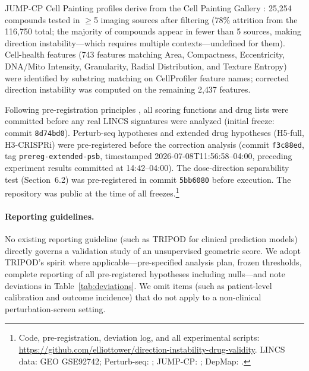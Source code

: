 \documentclass[11pt]{article}
\begin{document}
JUMP-CP Cell Painting profiles derive from the Cell Painting Gallery
\citep{chandrasekaran2023jump}: 25{,}254 compounds tested in $\geq$5
imaging sources after filtering (78\% attrition from the 116{,}750
total; the majority of compounds appear in fewer than 5 sources,
making direction instability---which requires multiple
contexts---undefined for them). Cell-health features (743 features matching Area,
Compactness, Eccentricity, DNA/Mito Intensity, Granularity, Radial
Distribution, and Texture Entropy) were identified by substring matching
on CellProfiler feature names; corrected direction instability was computed
on the remaining 2{,}437 features.

Following pre-registration principles \citep{nosek2018preregistration},
all scoring functions and drug lists were committed before any real LINCS
signatures were analyzed (initial freeze: commit \texttt{8d74bd0}).
Perturb-seq hypotheses and extended drug hypotheses (H5-full,
H3-CRISPRi) were pre-registered before the correction analysis
(commit \texttt{f3c88ed}, tag \texttt{prereg-extended-psb}, timestamped
2026-07-08T11:56:58--04:00, preceding experiment results committed at
14:42--04:00). The dose-direction separability test
(Section~6.2) was pre-registered in commit \texttt{5bb6080} before
execution. The repository was public at the time of all freezes.\footnote{Code, pre-registration, deviation log, and all
experimental scripts:
\url{https://github.com/elliottower/direction-instability-drug-validity}.
LINCS data: GEO GSE92742; Perturb-seq: \citet{replogle2022mapping};
JUMP-CP: \citet{chandrasekaran2023jump}; DepMap: \citet{dempster2021chronos}.}

\paragraph{Reporting guidelines.}
No existing reporting guideline (such as TRIPOD for clinical prediction models)
directly governs a validation study of an unsupervised geometric score.
We adopt TRIPOD's spirit where applicable---pre-specified analysis plan,
frozen thresholds, complete reporting of all pre-registered hypotheses
including nulls---and note deviations in Table~\ref{tab:deviations}.
We omit items (such as patient-level calibration and outcome incidence) that
do not apply to a non-clinical perturbation-screen setting.
\end{document}
